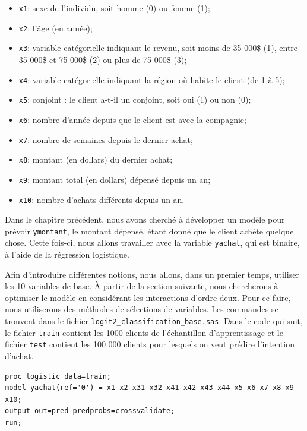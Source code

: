 \documentclass[
  11pt,
  letterpaper,
]{book}
\providecommand{\tightlist}{%
  \setlength{\itemsep}{0pt}\setlength{\parskip}{0pt}}
\theoremstyle{definition}
\theoremstyle{definition}
\theoremstyle{definition}
\theoremstyle{remark}
\begin{document}
\begin{itemize}
\tightlist
\item
  \texttt{x1}: sexe de l'individu, soit homme (0) ou femme (1);
\item
  \texttt{x2}: l'âge (en année);
\item
  \texttt{x3}: variable catégorielle indiquant le revenu, soit moins de 35 000\$ (1), entre 35 000\$ et 75 000\$ (2) ou plus de 75 000\$ (3);
\item
  \texttt{x4}: variable catégorielle indiquant la région où habite le client (de 1 à 5);
\item
  \texttt{x5}: conjoint : le client a-t-il un conjoint, soit oui (1) ou non (0);
\item
  \texttt{x6}: nombre d'année depuis que le client est avec la compagnie;
\item
  \texttt{x7}: nombre de semaines depuis le dernier achat;
\item
  \texttt{x8}: montant (en dollars) du dernier achat;
\item
  \texttt{x9}: montant total (en dollars) dépensé depuis un an;
\item
  \texttt{x10}: nombre d'achats différents depuis un an.
\end{itemize}

Dans le chapitre précédent, nous avons cherché à développer un modèle pour prévoir \texttt{ymontant}, le montant dépensé, étant donné que le client achète quelque chose. Cette fois-ci, nous allons travailler avec la variable \texttt{yachat}, qui est binaire, à l'aide de la régression logistique.

Afin d'introduire différentes notions, nous allons, dans un premier temps, utiliser les 10 variables de base. À partir de la section suivante, nous chercherons à optimiser le modèle en considérant les interactions d'ordre deux. Pour ce faire, nous utiliserons des méthodes de sélections de variables. Les commandes se trouvent dans le fichier \texttt{logit2\_classification\_base.sas}. Dans le code qui suit, le fichier \texttt{train} contient les 1000 clients de l'échantillon d'apprentissage et le fichier \texttt{test} contient les 100 000 clients pour lesquels on veut prédire l'intention d'achat.

\begin{verbatim}
proc logistic data=train;
model yachat(ref='0') = x1 x2 x31 x32 x41 x42 x43 x44 x5 x6 x7 x8 x9 x10;
output out=pred predprobs=crossvalidate;
run;
\end{verbatim}
\end{document}
